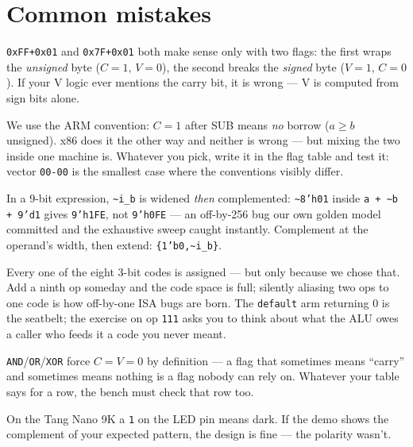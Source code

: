 \section{Common mistakes}\label{sec:cm14}

\begin{tripwire}
\texttt{0xFF+0x01} and \texttt{0x7F+0x01} both make sense only with
two flags: the first wraps the \emph{unsigned} byte ($C=1$, $V=0$),
the second breaks the \emph{signed} byte ($V=1$, $C=0$). If your V
logic ever mentions the carry bit, it is wrong --- V is computed from
sign bits alone.
\end{tripwire}
\begin{tripwire}
We use the ARM convention: $C=1$ after SUB means \emph{no} borrow
($a\geq b$ unsigned). x86 does it the other way and neither is wrong
--- but mixing the two inside one machine is. Whatever you pick,
write it in the flag table and test it: vector \texttt{00-00} is the
smallest case where the conventions visibly differ.
\end{tripwire}
\begin{tripwire}
In a 9-bit expression, \texttt{\textasciitilde i\_b} is widened
\emph{then} complemented: \texttt{\textasciitilde 8'h01} inside
\texttt{a + \textasciitilde b + 9'd1} gives \texttt{9'h1FE}, not
\texttt{9'h0FE} --- an off-by-256 bug our own golden model committed
and the exhaustive sweep caught instantly. Complement at the operand's
width, then extend: \texttt{\{1'b0,\textasciitilde i\_b\}}.
\end{tripwire}
\begin{tripwire}
Every one of the eight 3-bit codes is assigned --- but only because we
chose that. Add a ninth op someday and the code space is full;
silently aliasing two ops to one code is how off-by-one ISA bugs are
born. The \texttt{default} arm returning 0 is the seatbelt; the
exercise on op \texttt{111} asks you to think about what the ALU owes
a caller who feeds it a code you never meant.
\end{tripwire}
\begin{tripwire}
\texttt{AND}/\texttt{OR}/\texttt{XOR} force $C=V=0$ by definition ---
a flag that sometimes means ``carry'' and sometimes means nothing is a
flag nobody can rely on. Whatever your table says for a row, the bench
must check that row too.
\end{tripwire}
\begin{tripwire}
On the Tang Nano 9K a \texttt{1} on the LED pin means dark. If the
demo shows the complement of your expected pattern, the design is
fine --- the polarity wasn't.
\end{tripwire}

